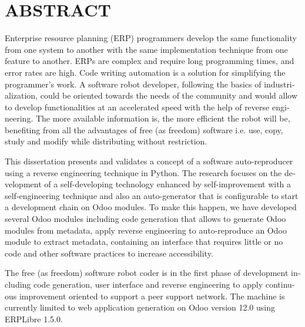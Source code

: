 


\chapter*{ABSTRACT}\thispagestyle{headings}
%
\begin{otherlanguage}{english}
Enterprise resource planning (ERP) programmers develop the same functionality from one system to another with the same implementation technique from one feature to another. ERPs are complex and require long programming times, and error rates are high. Code writing automation is a solution for simplifying the programmer's work. A software robot developer, following the basics of industrialization, could be oriented towards the needs of the community and would allow to develop functionalities at an accelerated speed with the help of reverse engineering. The more available information is, the more efficient the robot will be, benefiting from all the advantages of free (as freedom) software i.e. use, copy, study and modify while distributing without restriction.

This dissertation presents and validates a concept of a software auto-reproducer using a reverse engineering technique in Python. The research focuses on the development of a self-developing technology enhanced by self-improvement with a self-engineering technique and also an auto-generator that is configurable to start a development chain on Odoo modules. To make this happen, we have developed several Odoo modules including code generation that allows to generate Odoo modules from metadata, apply reverse engineering to auto-reproduce an Odoo module to extract metadata, containing an interface that requires little or no code and other software practices to increase accessibility.

The free (as freedom) software robot coder is in the first phase of development including code generation, user interface and reverse engineering to apply continuous improvement oriented to support a peer support network. The machine is currently limited to web application generation on Odoo version 12.0 using ERPLibre 1.5.0.


\end{otherlanguage}
